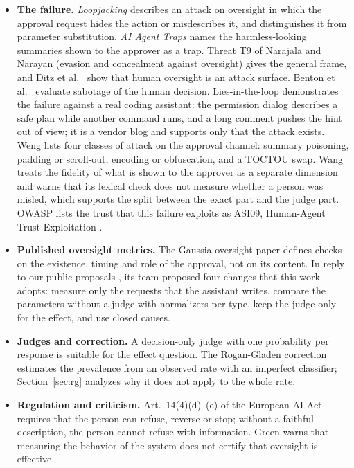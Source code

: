 \documentclass[11pt,a4paper]{article}
\begin{document}
\begin{itemize}
  \item \textbf{The failure.} \textit{Loopjacking} \cite{loopjacking} describes an attack on oversight in which
    the approval request hides the action or misdescribes it, and distinguishes it from parameter substitution.
    \textit{AI Agent Traps} \cite{franklin} names the harmless-looking summaries shown to the approver as a trap.
    Threat T9 of Narajala and Narayan \cite{narajala} (evasion and concealment against oversight) gives the
    general frame, and Ditz et al.\ \cite{ditz} show that human oversight is an attack surface. Benton et al.\
    \cite{benton} evaluate sabotage of the human decision. Lies-in-the-loop \cite{checkmarx2025} demonstrates
    the failure against a real coding assistant: the permission dialog describes a safe plan while another
    command runs, and a long comment pushes the hint out of view; it is a vendor blog and supports only that the
    attack exists. Weng \cite{consentintegrity} lists four classes of attack on the approval channel: summary
    poisoning, padding or scroll-out, encoding or obfuscation, and a TOCTOU swap. Wang
    \cite{argumentlaundering} treats the fidelity of what is shown to the approver as a separate dimension and
    warns that its lexical check does not measure whether a person was misled, which supports the split between
    the exact part and the judge part. OWASP lists the trust that this failure exploits as ASI09, Human-Agent
    Trust Exploitation \cite{owaspagentic}.
  \item \textbf{Published oversight metrics.} The Gaussia oversight paper \cite{gaussia2026} defines checks on
    the existence, timing and role of the approval, not on its content. In reply to our public proposals
    \cite{gaussiadisc}, its team proposed four changes that this work adopts: measure only the requests that the
    assistant writes, compare the parameters without a judge with normalizers per type, keep the judge only for
    the effect, and use closed causes.
  \item \textbf{Judges and correction.} A decision-only judge with one probability per response \cite{jev} is
    suitable for the effect question. The Rogan-Gladen correction \cite{rogan1978} estimates the prevalence from
    an observed rate with an imperfect classifier; Section~\ref{sec:rg} analyzes why it does not apply to the
    whole rate.
  \item \textbf{Regulation and criticism.} Art.~14(4)(d)--(e) of the European AI Act requires that the person can
    refuse, reverse or stop; without a faithful description, the person cannot refuse with information. Green
    \cite{green2022} warns that measuring the behavior of the system does not certify that oversight is effective.
\end{itemize}
\end{document}
